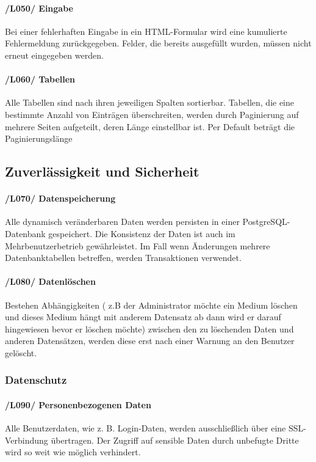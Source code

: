 \documentclass{article}
\begin{document}
      \paragraph{/L050/ \label{L050} Eingabe}
      Bei einer fehlerhaften Eingabe in ein HTML-Formular wird eine kumulierte Fehlermeldung zurückgegeben. Felder, die bereits ausgefüllt wurden, müssen nicht erneut eingegeben werden.
      
      \paragraph{/L060/ \label{L060} Tabellen}
      
    Alle Tabellen sind nach ihren jeweiligen Spalten sortierbar. Tabellen,
    die eine bestimmte Anzahl von Einträgen überschreiten, werden durch Paginierung auf mehrere Seiten aufgeteilt, deren Länge einstellbar ist. Per Default beträgt die Paginierungslänge 
      
      
\subsection{Zuverlässigkeit und Sicherheit}
   \paragraph{/L070/ \label{070} Datenspeicherung}
   Alle dynamisch veränderbaren Daten werden persisten in einer PostgreSQL-Datenbank gespeichert. Die Konsistenz der Daten ist auch im Mehrbenutzerbetrieb gewährleistet. Im Fall wenn  Änderungen mehrere Datenbanktabellen betreffen, werden Transaktionen verwendet.
  
   \paragraph{/L080/ \label{080} Datenlöschen}
   
  Bestehen Abhängigkeiten ( z.B der Administrator möchte ein Medium löschen und dieses Medium hängt mit anderem Datensatz ab dann wird er  darauf hingewiesen bevor  er  löschen möchte)  zwischen den zu löschenden Daten und anderen Datensätzen, werden diese erst nach einer Warnung an den Benutzer gelöscht.
  
\subsubsection{Datenschutz}
	\paragraph{/L090/ \label{L090} 
	Personenbezogenen Daten} 
	Alle Benutzerdaten, wie z. B. Login-Daten, werden ausschließlich über eine SSL-Verbindung übertragen. Der Zugriff auf sensible Daten durch unbefugte Dritte wird so weit wie möglich verhindert.
		    
\end{document}
